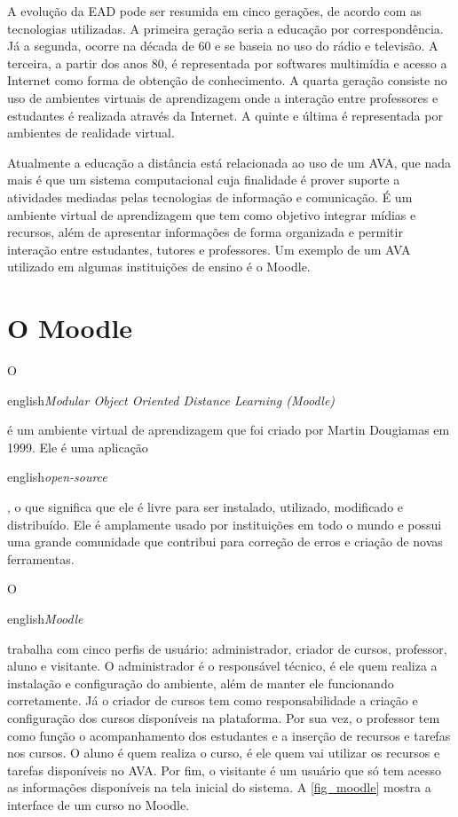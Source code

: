 \documentclass[
	12pt,				%
	openright,			%
	oneside,			%
	a4paper,			%
	english,			%
	french,				%
	spanish,			%
	brazil				%
	]{abntex2}
\begin{document}
A evolução da EAD pode ser resumida em cinco gerações, de acordo com as tecnologias utilizadas. A primeira geração seria a educação por correspondência. Já a segunda, ocorre na década de 60 e se baseia no uso do rádio e televisão. A terceira, a partir dos anos 80, é representada por softwares multimídia e acesso a Internet como forma de obtenção de conhecimento. A quarta geração consiste no uso de ambientes virtuais de aprendizagem onde a interação entre professores e estudantes é realizada através da Internet. A quinte e última é representada por ambientes de realidade virtual\cite{maia2003}.

Atualmente a educação a distância está relacionada ao uso de um AVA, que nada mais é que um sistema computacional cuja finalidade é prover suporte a atividades mediadas pelas tecnologias de informação e comunicação\cite{Almeida2010}. É um ambiente virtual de aprendizagem que tem como objetivo integrar mídias e recursos, além de apresentar informações de forma organizada e permitir interação entre estudantes, tutores e professores\cite{Franciscato2008}. Um exemplo de um AVA utilizado em algumas instituições de ensino é o Moodle.
   
\section{O Moodle}
O \begin{otherlanguage*}{english}\textit{Modular Object Oriented Distance Learning (Moodle)}\end{otherlanguage*} é um ambiente virtual de aprendizagem que foi criado por Martin Dougiamas em 1999. Ele é uma aplicação \begin{otherlanguage*}{english}\textit{open-source}\end{otherlanguage*}, o que significa que ele é livre para ser instalado, utilizado, modificado e distribuído. Ele é amplamente usado por instituições em todo o mundo e possui uma grande comunidade que contribui para correção de erros e criação de novas ferramentas. \cite{Ribeiro2007}

O \begin{otherlanguage*}{english}\textit{Moodle}\end{otherlanguage*} trabalha com cinco perfis de usuário: administrador, criador de cursos, professor, aluno e visitante. O administrador é o responsável técnico, é ele quem realiza a instalação e configuração do ambiente, além de manter ele funcionando corretamente. Já o criador de cursos tem como responsabilidade a criação e configuração dos cursos disponíveis na plataforma. Por sua vez, o professor tem como função o acompanhamento dos estudantes e a inserção de recursos e tarefas nos cursos. O aluno é quem realiza o curso, é ele quem vai utilizar os recursos e tarefas disponíveis no AVA. Por fim, o visitante é um usuário que só tem acesso as informações disponíveis na tela inicial do sistema. A \autoref{fig_moodle} mostra a interface de um curso no Moodle.
\end{document}
